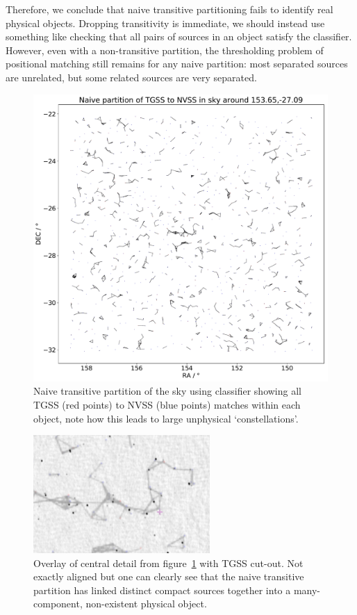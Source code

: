 \documentclass[12pt,a4paper]{article}
\begin{document}
Therefore, we conclude that naive transitive partitioning fails to identify real physical objects. Dropping transitivity is immediate, we should instead use something like checking that all pairs of sources in an object satisfy the classifier. However, even with a non-transitive partition, the thresholding problem of positional matching still remains for any naive partition: most separated sources are unrelated, but some related sources are very separated.

\begin{figure}[H]
    \centering
    \includegraphics[width=\textwidth]{pics/torch_lr_partition.pdf}
    \caption{Naive transitive partition of the sky using classifier showing all TGSS (red points) to NVSS (blue points) matches within each object, note how this leads to large unphysical `constellations'.}
    \label{fig:torch_lr_partition}%
\end{figure}

\begin{figure}[H]
    \centering
    \includegraphics[width=0.6\textwidth]{pics/overlayoverlay.png}
    \caption{Overlay of central detail from figure~\ref{fig:torch_lr_partition} with TGSS cut-out. Not exactly aligned but one can clearly see that the naive transitive partition has linked distinct compact sources together into a many-component, non-existent physical object.}
    \label{fig:overlay}
\end{figure}
\end{document}
